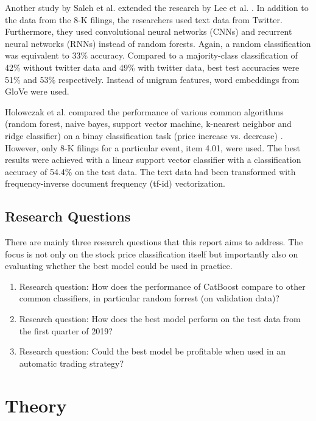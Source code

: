 \documentclass{article}
\begin{document}
	Another study by Saleh et al. extended the research by Lee et al. \cite{saleh_neural_nodate}. In addition to the data from the 8-K filings, the researchers used text data from Twitter. Furthermore, they used convolutional neural networks (CNNs) and recurrent neural networks (RNNs) instead of random forests. Again,  a random classification was equivalent to 33\% accuracy. Compared to a majority-class classification of 42\% without twitter data and 49\% with twitter data, best test accuracies were 51\% and 53\% respectively. Instead of unigram features, word embeddings from GloVe were used.
	
	Holowczak et al. compared the performance of various common algorithms (random forest, naive bayes, support vector machine, k-nearest neighbor and ridge classifier) on a binay classification task (price increase vs. decrease) \cite{holowczak_testing_2019}. However, only 8-K filings for a particular event, item 4.01, were used. The best results were achieved with a linear support vector classifier with a classification accuracy of 54.4\% on the test data. The text data had been transformed with frequency-inverse document frequency (tf-id) vectorization.

	\subsection{Research Questions}
	
	There are mainly three research questions that this report aims to address. The focus is not only on the stock price classification itself but importantly also on evaluating whether the best model could be used in practice.
	
	\begin{enumerate}
		\item Research question: How does the performance of CatBoost compare to other common classifiers, in particular random forrest (on validation data)?
		\item Research question: How does the best model perform on the test data from the first quarter of 2019?
		\item Research question: Could the best model be profitable when used in an automatic trading strategy?
	
	\end{enumerate}

	\section{Theory}
	
\end{document}
